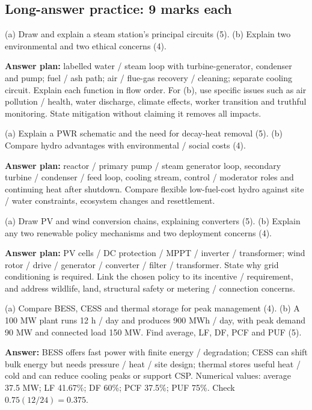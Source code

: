 \documentclass[11pt,a4paper]{article}
\newenvironment{Worked}[1]{\begin{tcolorbox}[breakable=false,colback=white,colframe=teal,colbacktitle=pale,coltitle=ink,title={#1}]}{\end{tcolorbox}}
\begin{document}
\subsection{Long-answer practice: 9 marks each}
\begin{Worked}{L1 - Thermal generation}
(a) Draw and explain a steam station's principal circuits (5). (b) Explain two environmental and two ethical concerns (4).\par
\textbf{Answer plan:} labelled water / steam loop with turbine-generator, condenser and pump; fuel / ash path; air / flue-gas recovery / cleaning; separate cooling circuit. Explain each function in flow order. For (b), use specific issues such as air pollution / health, water discharge, climate effects, worker transition and truthful monitoring. State mitigation without claiming it removes all impacts.
\end{Worked}
\begin{Worked}{L2 - Nuclear and hydro}
(a) Explain a PWR schematic and the need for decay-heat removal (5). (b) Compare hydro advantages with environmental / social costs (4).\par
\textbf{Answer plan:} reactor / primary pump / steam generator loop, secondary turbine / condenser / feed loop, cooling stream, control / moderator roles and continuing heat after shutdown. Compare flexible low-fuel-cost hydro against site / water constraints, ecosystem changes and resettlement.
\end{Worked}
\begin{Worked}{L3 - Renewables and regulation}
(a) Draw PV and wind conversion chains, explaining converters (5). (b) Explain any two renewable policy mechanisms and two deployment concerns (4).\par
\textbf{Answer plan:} PV cells / DC protection / MPPT / inverter / transformer; wind rotor / drive / generator / converter / filter / transformer. State why grid conditioning is required. Link the chosen policy to its incentive / requirement, and address wildlife, land, structural safety or metering / connection concerns.
\end{Worked}
\begin{Worked}{L4 - Storage and loads}
(a) Compare BESS, CESS and thermal storage for peak management (4). (b) A 100 MW plant runs 12 h / day and produces 900 MWh / day, with peak demand 90 MW and connected load 150 MW. Find average, LF, DF, PCF and PUF (5).\par
\textbf{Answer:} BESS offers fast power with finite energy / degradation; CESS can shift bulk energy but needs pressure / heat / site design; thermal stores useful heat / cold and can reduce cooling peaks or support CSP. Numerical values: average 37.5 MW; LF 41.67\%; DF 60\%; PCF 37.5\%; PUF 75\%. Check $0.75(12/24)=0.375$.
\end{Worked}
\end{document}
